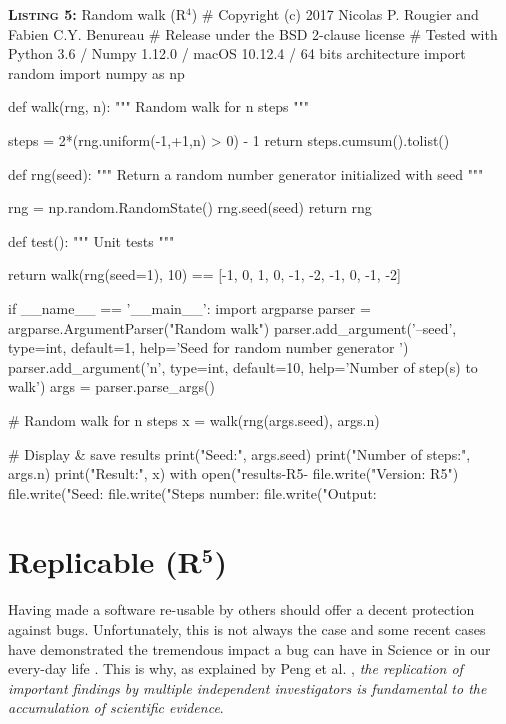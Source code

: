 \documentclass[a4paper,11pt]{article}
\begin{document}
\begin{code}{\textbf{\textsc{Listing 5:}} Random walk (R$^4$)}
# Copyright (c) 2017 Nicolas P. Rougier and Fabien C.Y. Benureau
# Release under the BSD 2-clause license
# Tested with Python 3.6 / Numpy 1.12.0 / macOS 10.12.4 / 64 bits architecture
import random
import numpy as np

def walk(rng, n):
    """ Random walk for n steps """

    steps = 2*(rng.uniform(-1,+1,n) > 0) - 1
    return steps.cumsum().tolist()

def rng(seed):
    """ Return a random number generator initialized with seed """ 
    
    rng = np.random.RandomState()
    rng.seed(seed)
    return rng

def test():
    """ Unit tests """

    return walk(rng(seed=1), 10) == [-1, 0, 1, 0, -1, -2, -1, 0, -1, -2]

if __name__ == '__main__':
    import argparse
    parser = argparse.ArgumentParser("Random walk")
    parser.add_argument('--seed', type=int, default=1,
                        help='Seed for random number generator ')
    parser.add_argument('n', type=int, default=10,
                        help='Number of step(s) to walk')
    args = parser.parse_args()

    # Random walk for n steps
    x = walk(rng(args.seed), args.n)

    # Display & save results
    print("Seed:", args.seed)
    print("Number of steps:", args.n)
    print("Result:",  x)
    with open("results-R5-%
        file.write("Version: R5")
        file.write("Seed: %
        file.write("Steps number: %
        file.write("Output: %
\end{code}


\section*{Replicable (R$^{\mathbf 5}$)}

Having made a software re-usable by others should offer a decent protection
against bugs.  Unfortunately, this is not always the case and some recent cases
have demonstrated the tremendous impact a bug can have in Science
\citep{Eklund:2016} or in our every-day life \citep{Durumeric:2014}.  This is
why, as explained by Peng et al. \cite{Peng:2006}, {\em the replication of
  important findings by multiple independent investigators is fundamental to
  the accumulation of scientific evidence}.\\
\end{document}
